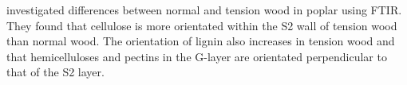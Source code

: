 \cite{Chang_2013} investigated differences between normal and tension wood in poplar using FTIR. They found that cellulose is more orientated within the S2 wall of tension wood than normal wood. The orientation of lignin also increases in tension wood and that hemicelluloses and pectins in the G-layer are orientated perpendicular to that of the S2 layer. 